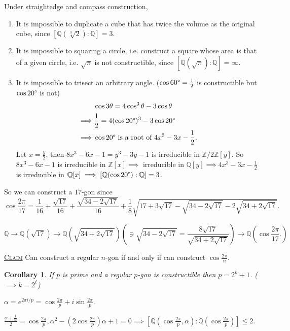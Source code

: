 \documentclass{article}
\newcommand{\Z}{\mathbb{Z}}
\newcommand{\Q}{\mathbb{Q}}
\newcommand{\fancyem}[1]{\underline{\textsc{#1}}}
\newtheorem*{corollary}{Corollary}
\theoremstyle{definition}
\theoremstyle{remark}
\begin{document}
Under straightedge and compass construction,
\begin{enumerate}
  \item It is impossible to duplicate a cube that has twice the volume as the original cube, since $[\Q(\sqrt[3]{2}):\Q] = 3$.
  \item It is impossible to squaring a circle, i.e. construct a square whose area is that of a given circle, i.e. $\sqrt{\pi}$ is not constructible, since $[\Q(\sqrt{\pi}):\Q] = \infty$.
  \item It is impossible to trisect an arbitrary angle. ($\cos 60\degree = \frac{1}{2}$ is constructible but $\cos 20\degree$ is not)
  \begin{align*}
    & \cos 3\theta = 4\cos^3\theta - 3\cos\theta \\
    \implies & \frac{1}{2} = 4(\cos 20\degree)^3 - 3 \cos 20\degree \\
    \implies & \cos 20\degree \text{ is a root of } 4x^3 - 3x - \frac{1}{2}.
  \end{align*}
  Let $x = \frac{y}{2}$, then $8x^3 - 6x - 1 = y^3 - 3y - 1$ is irreducible in $\Z/2\Z[y]$. So $8x^3 - 6x - 1$ is irreducible in $\Z[x] \implies $ irreducible in $\Q[y] \implies 4x^3 - 3x - \frac{1}{2}$ is irreducible in $\Q[x] \implies [\Q(\cos 20\degree): \Q] = 3$.
\end{enumerate}

So we can construct a $17$-gon since
\[
  \cos \frac{2\pi}{17} = \frac{1}{16} + \frac{\sqrt{17}}{16} + \frac{\sqrt{34 - 2\sqrt{17}}}{16} + \frac{1}{8}\sqrt{17 + 3\sqrt{17} - \sqrt{34 - 2\sqrt{17}} - 2\sqrt{34 + 2\sqrt{17}}}.
\]

\[
\Q \to \Q(\sqrt{17}) \to \Q\left(\sqrt{34 + 2\sqrt{17}}\right) \left(\ni \sqrt{34 - 2\sqrt{17}} = \frac{8\sqrt{17}}{\sqrt{34 + 2\sqrt{17}}}\right) \to \Q\left(\cos \frac{2\pi}{17}.\right)
\]

\fancyem{Claim} Can construct a regular $n$-gon if and only if can construct $\cos \frac{2\pi}{n}$.

\begin{corollary}
  If $p$ is prime and a regular $p$-gon is constructible then $p = 2^k + 1$. ($\implies k = 2^\ell$)
\end{corollary}

$\alpha = e^{2\pi i/p} = \cos \frac{2\pi}{p} + i\sin\frac{2\pi}{p}$.

$\frac{\alpha + \frac{1}{\alpha}}{2} = \cos \frac{2\pi}{p}, \alpha^2 - (2\cos \frac{2\pi}{p})\alpha + 1 = 0 \implies \left[\Q\left(\cos \frac{2\pi}{p}, \alpha\right): \Q\left(\cos\frac{2\pi}{p}\right)\right] \leq 2$.
\end{document}
